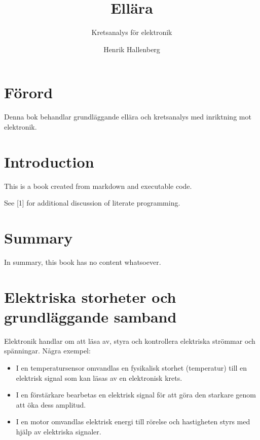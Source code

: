 \documentclass[
  swedish,
  11pt,
  a4paper,
  DIV=11,
  numbers=noendperiod,
  twoside,
  open=any]{scrreprt}
\title{Ellära}
\subtitle{Kretsanalys för elektronik}
\author{Henrik Hallenberg}
\date{}
\renewcommand*\contentsname{Innehållsförteckning}
\newcommand\contentsname{Innehållsförteckning}
\begin{document}
\maketitle

\renewcommand*\contentsname{Innehåll}
{
\setcounter{tocdepth}{1}
\tableofcontents
}


\chapter*{Förord}\label{fuxf6rord}


Denna bok behandlar grundläggande ellära och kretsanalys med inriktning
mot elektronik.


\chapter{Introduction}\label{introduction}

This is a book created from markdown and executable code.

See {[}1{]} for additional discussion of literate programming.


\chapter{Summary}\label{summary}

In summary, this book has no content whatsoever.


\chapter{Elektriska storheter och grundläggande
samband}\label{sec-grunder}

Elektronik handlar om att läsa av, styra och kontrollera elektriska
strömmar och spänningar. Några exempel:

\begin{itemize}
\item
  I en temperatursensor omvandlas en fysikalisk storhet (temperatur)
  till en elektrisk signal som kan läsas av en elektronisk krets.
\item
  I en förstärkare bearbetas en elektrisk signal för att göra den
  starkare genom att öka dess amplitud.
\item
  I en motor omvandlas elektrisk energi till rörelse och hastigheten
  styrs med hjälp av elektriska signaler.
\end{itemize}
\end{document}
